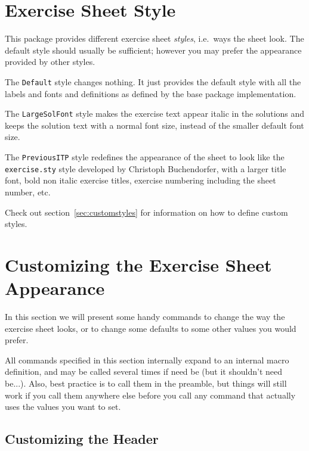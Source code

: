 \documentclass[11pt,a4paper]{article}
\begin{document}
\section{Exercise Sheet Style}
\label{sec:styles}

This package provides different exercise sheet \emph{styles}, i.e.\ ways the sheet
look. The default style should usually be sufficient; however you may prefer the
appearance provided by other styles.


The \texttt{Default} style changes nothing. It just provides the default style with all
the labels and fonts and definitions as defined by the base package implementation.

The \texttt{LargeSolFont} style makes the exercise text appear italic in the solutions and
keeps the solution text with a normal font size, instead of the smaller default font
size.

The \texttt{PreviousITP} style redefines the appearance of the sheet to look like the
\texttt{exercise.sty} style developed by Christoph Buchendorfer, with a larger title font,
bold non italic exercise titles, exercise numbering including the sheet number, etc.

Check out section~\ref{sec:customstyles} for information on how to define custom styles.

\section{Customizing the Exercise Sheet Appearance}
\label{sec:CustomizeSheet}

In this section we will present some handy commands to change the way the exercise sheet
looks, or to change some defaults to some other values you would prefer.

All  commands specified in this section internally expand to
an internal macro definition, and may be called several times if need be (but it shouldn't
need be...). Also, best practice is to call them in the preamble, but things will still
work if you call them anywhere else before you call any command that actually uses the
values you want to set.

\subsection{Customizing the Header}
\label{sec:CustomHeader}
\end{document}
